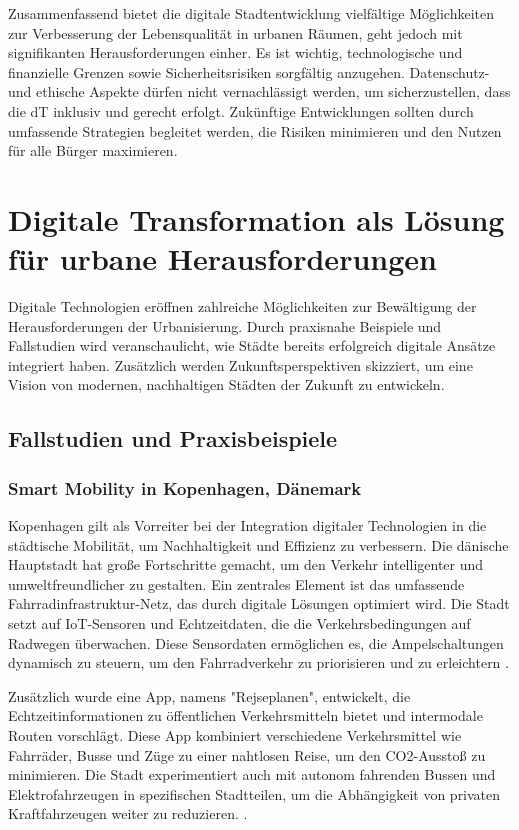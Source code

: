 \documentclass[conference,compsoc,final,a4paper, onecolumn, 11pt]{IEEEtran}
\begin{document}
Zusammenfassend bietet die digitale Stadtentwicklung vielfältige Möglichkeiten zur Verbesserung der Lebensqualität in urbanen Räumen, geht jedoch mit signifikanten Herausforderungen einher. 
Es ist wichtig, technologische und finanzielle Grenzen sowie Sicherheitsrisiken sorgfältig anzugehen. 
Datenschutz- und ethische Aspekte dürfen nicht vernachlässigt werden, um sicherzustellen, dass die \ac{dT} inklusiv und gerecht erfolgt. 
Zukünftige Entwicklungen sollten durch umfassende Strategien begleitet werden, die Risiken minimieren und den Nutzen für alle Bürger maximieren.


\section{Digitale Transformation als Lösung für urbane Herausforderungen}
Digitale Technologien eröffnen zahlreiche Möglichkeiten zur Bewältigung der Herausforderungen der Urbanisierung. 
Durch praxisnahe Beispiele und Fallstudien wird veranschaulicht, wie Städte bereits erfolgreich digitale Ansätze integriert haben. 
Zusätzlich werden Zukunftsperspektiven skizziert, um eine Vision von modernen, nachhaltigen Städten der Zukunft zu entwickeln.

\subsection{Fallstudien und Praxisbeispiele}
\subsubsection{Smart Mobility in Kopenhagen, Dänemark}
Kopenhagen gilt als Vorreiter bei der Integration digitaler Technologien in die städtische Mobilität, um Nachhaltigkeit und Effizienz zu verbessern. 
Die dänische Hauptstadt hat große Fortschritte gemacht, um den Verkehr intelligenter und umweltfreundlicher zu gestalten. 
Ein zentrales Element ist das umfassende Fahrradinfrastruktur-Netz, das durch digitale Lösungen optimiert wird. 
Die Stadt setzt auf IoT-Sensoren und Echtzeitdaten, die die Verkehrsbedingungen auf Radwegen überwachen. 
Diese Sensordaten ermöglichen es, die Ampelschaltungen dynamisch zu steuern, um den Fahrradverkehr zu priorisieren und zu erleichtern \autocite{andreaseisenring_grune_2021}. 

Zusätzlich wurde eine App, namens "Rejseplanen", entwickelt, die Echtzeitinformationen zu öffentlichen Verkehrsmitteln bietet und intermodale Routen vorschlägt. 
Diese App kombiniert verschiedene Verkehrsmittel wie Fahrräder, Busse und Züge zu einer nahtlosen Reise, um den CO2-Ausstoß zu minimieren. \autocite{noauthor_rejseplanen_nodate}
Die Stadt experimentiert auch mit autonom fahrenden Bussen und Elektrofahrzeugen in spezifischen Stadtteilen, um die Abhängigkeit von privaten Kraftfahrzeugen weiter zu reduzieren. \autocite{noauthor_smart_nodate-2}. 
\end{document}
